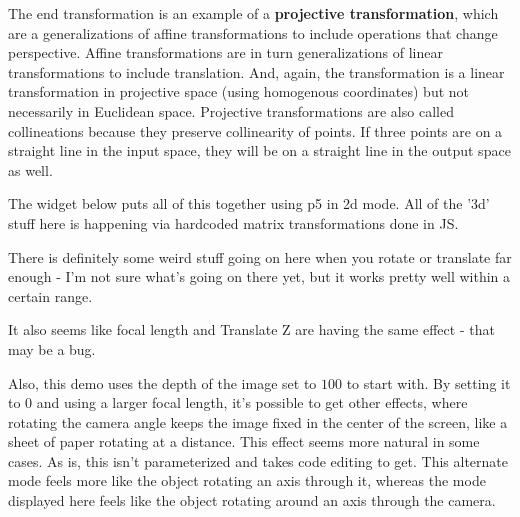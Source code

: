 \documentclass{article}
\begin{document}
The end transformation is an example of a \textbf{projective transformation}, which are a generalizations of affine transformations to include operations that change perspective. Affine transformations are in turn generalizations of linear transformations to include translation. And, again, the transformation is a linear transformation in projective space (using homogenous coordinates) but not necessarily in Euclidean space. Projective transformations are also called collineations because they preserve collinearity of points. If three points are on a straight line in the input space, they will be on a straight line in the output space as well.

The widget below puts all of this together using p5 in 2d mode. All of the '3d' stuff here is happening via hardcoded matrix transformations done in JS.


There is definitely some weird stuff going on here when you rotate or translate far enough - I'm not sure what's going on there yet, but it works pretty well within a certain range.

It also seems like focal length and Translate Z are having the same effect - that may be a bug.

Also, this demo uses the depth of the image set to $100$ to start with. By setting it to $0$ and using a larger focal length, it's possible to get other effects, where rotating the camera angle keeps the image fixed in the center of the screen, like a sheet of paper rotating at a distance. This effect seems more natural in some cases. As is, this isn't parameterized and takes code editing to get. This alternate mode feels more like the object rotating an axis through it, whereas the mode displayed here feels like the object rotating around an axis through the camera.
\end{document}
